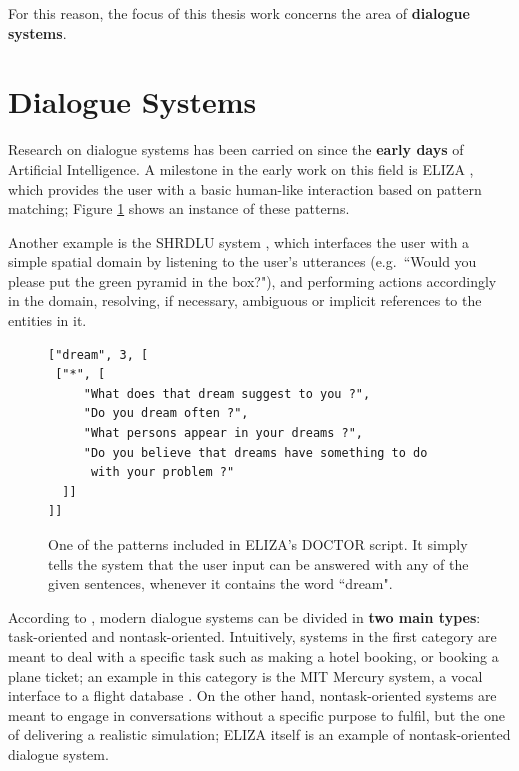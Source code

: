 For this reason, the focus of this thesis work concerns the area of \textbf{dialogue systems}.

\section{Dialogue Systems}\label{ch:introduction:ds}
Research on dialogue systems has been carried on since the \textbf{early days} of Artificial Intelligence. A milestone in the early work on this field is ELIZA \citep{Weizenbaum:1966:ECP:365153.365168}, which provides the user with a basic human-like interaction based on pattern matching; Figure \ref{ch:rw:ds:ELIZA} shows an instance of these patterns.

Another example is the SHRDLU system \citep{winograd1971procedure}, which interfaces the user with a simple spatial domain by listening to the user's utterances (e.g.\ ``Would you please put the green pyramid in the box?"), and performing actions accordingly in the domain, resolving, if necessary, ambiguous or implicit references to the entities in it.

\begin{figure}
\begin{Verbatim}[frame=single]
["dream", 3, [
 ["*", [
     "What does that dream suggest to you ?",
     "Do you dream often ?",
     "What persons appear in your dreams ?",
     "Do you believe that dreams have something to do
      with your problem ?"
  ]]
]]
\end{Verbatim}
\caption{One of the patterns included in ELIZA's DOCTOR script. It simply tells the system that the user input can be answered with any of the given sentences, whenever it contains the word ``dream".}
\label{ch:rw:ds:ELIZA}
\end{figure}

According to \cite{Jokinen2009}, modern dialogue systems can be divided in \textbf{two main types}: task-oriented and nontask-oriented. Intuitively, systems in the first category are meant to deal with a specific task such as making a hotel booking, or booking a plane ticket; an example in this category is the MIT Mercury system, a vocal interface to a flight database \citep{Seneff:2000:DMM:1605285.1605288}. On the other hand, nontask-oriented systems are meant to engage in conversations without a specific purpose to fulfil, but the one of delivering a realistic simulation; ELIZA itself is an example of nontask-oriented dialogue system.

